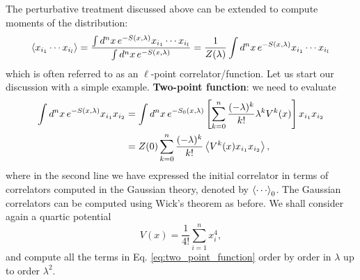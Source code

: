 \documentclass{article}
\numberwithin{equation}{section}
\begin{document}
The perturbative treatment discussed above can be extended to compute moments of the distribution:
\begin{equation} \label{eq:twopoint_correlator}
    \ev{x_{i_1} \cdots x_{i_l}} = \frac{\int d^nx \, e^{-S(x,\lambda)} x_{i_1} \cdots x_{i_l}}{\int d^nx\, e^{-S(x,\lambda)}} = \frac{1}{Z(\lambda)} \int d^nx\, e^{-S(x,\lambda)} x_{i_1} \cdots x_{i_l}
\end{equation}
which is often referred to as an $\ell$-point correlator/function. Let us start our discussion with a simple example. 
\textbf{Two-point function}: we need to evaluate
\begin{equation}
\begin{aligned} \label{eq:two_point_function}
    \int d^nx \, e^{-S(x, \lambda)} x_{i_1} x_{i_2} &= \int d^nx \, e^{-S_0(x, \lambda)} \left[\sum_{k=0}^n \frac{(-\lambda)^k}{k!} \lambda^k V^k(x)\right] x_{i_1} x_{i_2} \\
    &= Z(0) \sum_{k=0}^n \frac{(-\lambda)^k}{k!} \ev{V^k(x) x_{i_1} x_{i_2}},
\end{aligned}
\end{equation}
where in the second line we have expressed the initial correlator in terms of correlators computed in the Gaussian theory, denoted by $\ev{\cdots}_0$. The Gaussian correlators can be computed using Wick's theorem as before. We shall consider again a quartic potential
\begin{equation}
    V(x) = \frac{1}{4!} \sum_{i=1}^n x_i^4,
\end{equation}
and compute all the terms in Eq. \ref{eq:two_point_function} order by order in $\lambda$ up to order $\lambda^2$.
\end{document}
